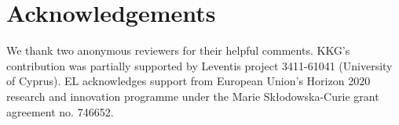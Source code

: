 \documentclass[output=paper]{langsci/langscibook}
\begin{document}
\printchapterglossary{}

\section*{Acknowledgements}

We thank two anonymous reviewers for their helpful comments. KKG’s contribution
was partially supported by Leventis project 3411-61041 (University of Cyprus).
EL acknowledges support from European Union’s Horizon 2020 research and
innovation programme under the Marie Skłodowska-Curie grant agreement no.
746652.

{\sloppy
\printbibliography[heading=subbibliography,notkeyword=this]
}
\end{document}
